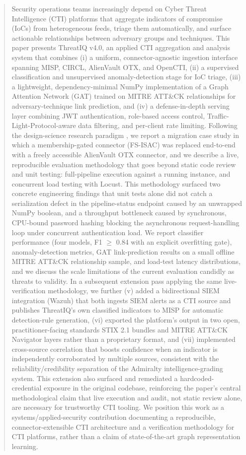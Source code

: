 \documentclass[conference]{IEEEtran}
\begin{document}
\begin{abstract}
Security operations teams increasingly depend on Cyber Threat Intelligence (CTI) platforms that aggregate indicators of compromise (IoCs) from heterogeneous feeds, triage them automatically, and surface actionable relationships between adversary groups and techniques. This paper presents ThreatIQ v4.0, an applied CTI aggregation and analysis system that combines (i) a uniform, connector-agnostic ingestion interface spanning MISP, CIRCL, AlienVault OTX, and OpenCTI, (ii) a supervised classification and unsupervised anomaly-detection stage for IoC triage, (iii) a lightweight, dependency-minimal NumPy implementation of a Graph Attention Network (GAT) trained on MITRE ATT\&CK relationships for adversary-technique link prediction, and (iv) a defense-in-depth serving layer combining JWT authentication, role-based access control, Traffic-Light-Protocol-aware data filtering, and per-client rate limiting. Following the design-science research paradigm \cite{hevner2004design}, we report a migration case study in which a membership-gated connector (FS-ISAC) was replaced end-to-end with a freely accessible AlienVault OTX connector, and we describe a live, reproducible evaluation methodology that goes beyond static code review and unit testing: full-pipeline execution against a running instance, and concurrent load testing with Locust. This methodology surfaced two concrete engineering findings that unit tests alone did not catch \textemdash{} a serialization defect in the pipeline-status endpoint caused by an unwrapped NumPy boolean, and a throughput bottleneck caused by synchronous, CPU-bound password hashing blocking the asynchronous request-handling loop under concurrent authentication load. We report classifier performance (four models, F1 $\geq$ 0.84 with an explicit overfitting gate), anomaly-detection metrics, GAT link-prediction results on a small offline MITRE ATT\&CK relationship sample, and load-test latency distributions, and we discuss the scale limitations of the current evaluation candidly as threats to validity. In a subsequent extension pass applying the same live-verification methodology, we further (v) added a bidirectional SIEM integration (Wazuh) that both ingests SIEM alerts as a CTI source and publishes ThreatIQ's own classified indicators to MISP for automatic detection-rule generation, (vi) exported the platform's output in two open, practitioner-facing standards \textemdash{} STIX 2.1 bundles and MITRE ATT\&CK Navigator layers \textemdash{} rather than a proprietary format, and (vii) implemented cross-source correlation that boosts confidence when an indicator is independently corroborated by multiple sources, consistent with the reliability/credibility separation of the Admiralty intelligence-grading system. This extension also surfaced and remediated a hardcoded-credential exposure in the original codebase, reinforcing the paper's central methodological claim that live execution and audit, not static review alone, are necessary for trustworthy CTI tooling. We position this work as a systems/applied-security contribution documenting a reproducible, connector-extensible CTI architecture and a verification methodology for CTI platforms, rather than a claim of state-of-the-art graph representation learning.
\end{abstract}
\end{document}
